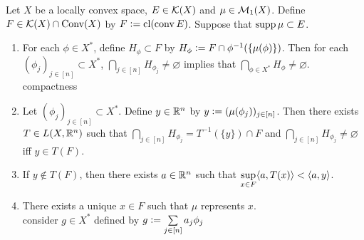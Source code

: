 \documentclass{book}
\begin{document}
	\begin{ex}
		Let $X$ be a locally convex space, $E \in \mathcal{K}(X)$ and $\mu \in \mathcal{M}_1(X)$. Define $F \in \mathcal{K}(X) \cap \text{Conv}(X)$ by $F \vcentcolon= \operatorname{cl} (\operatorname{conv} E)$. Suppose that $\operatorname{supp} \mu \subset E$. 
		\begin{enumerate}
			\item For each $\phi \in X^*$, define $H_{\phi} \subset F$ by $H_{\phi} \vcentcolon= F \cap \phi^{-1}(\{\mu(\phi)\})$. Then for each $(\phi_j)_{j \in [n]} \subset X^*$, $\bigcap\limits_{j \in[n]} H_{\phi_j} \neq \varnothing$ implies that $\bigcap\limits_{\phi \in X^*} H_{\phi} \neq \varnothing$. \\
			 compactness
			\item Let $(\phi_j)_{j \in [n]} \subset X^*$. Define $y \in \mathbb{R}^n$ by $y \vcentcolon= (\mu(\phi_j))_{j \in [n]}$. Then there exists $T \in L(X, \mathbb{R}^n)$ such that $\bigcap\limits_{j \in [n]} H_{\phi_j} = T^{-1}(\{y\}) \cap F$ and $\bigcap\limits_{j \in [n]} H_{\phi_j} \neq \varnothing$ iff $y \in T(F)$. 
			\item If $y \not \in T(F)$, then there exists $a \in \mathbb{R}^n$ such that $\sup\limits_{x \in F} \langle a, T(x) \rangle  < \langle a, y \rangle$. \\
			 
			\item There exists a unique $x \in F$ such that $\mu$ represents $x$. \\
			 consider $g \in X^*$ defined by $g \vcentcolon= \sum\limits_{j \in [n]} a_j \phi_j$
		\end{enumerate}
	\end{ex}
	
\end{document}
